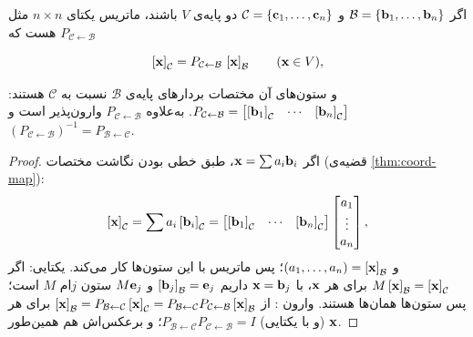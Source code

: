 \begin{theorem}\label{thm:change-basis}
اگر $\mathcal{B}=\{\mathbf{b}_1,\dots,\mathbf{b}_n\}$ و $\mathcal{C}=\{\mathbf{c}_1,\dots,\mathbf{c}_n\}$ دو پایه‌ی $V$ باشند، ماتریس یکتای $n\times n$ مثل $P_{\mathcal{C}\leftarrow\mathcal{B}}$ هست که
\begin{keyformula}
\[
\left[\mathbf{x}\right]_{\mathcal{C}}=P_{\mathcal{C}\leftarrow\mathcal{B}}\,\left[\mathbf{x}\right]_{\mathcal{B}}\qquad(\mathbf{x}\in V),
\]
\end{keyformula}
و ستون‌های آن مختصات بردارهای پایه‌ی $\mathcal{B}$ نسبت به $\mathcal{C}$ هستند:
$P_{\mathcal{C}\leftarrow\mathcal{B}}=\begin{bmatrix}\left[\mathbf{b}_1\right]_{\mathcal{C}}&\cdots&\left[\mathbf{b}_n\right]_{\mathcal{C}}\end{bmatrix}$.
به‌علاوه $P_{\mathcal{C}\leftarrow\mathcal{B}}$ وارون‌پذیر است و $(P_{\mathcal{C}\leftarrow\mathcal{B}})^{-1}=P_{\mathcal{B}\leftarrow\mathcal{C}}$.
\end{theorem}
\begin{proof}
اگر $\mathbf{x}=\sum a_i\mathbf{b}_i$، طبق خطی بودن نگاشت مختصات (قضیه‌ی \ref{thm:coord-map}):
\[
\left[\mathbf{x}\right]_{\mathcal{C}}=\sum a_i\left[\mathbf{b}_i\right]_{\mathcal{C}}=\begin{bmatrix}\left[\mathbf{b}_1\right]_{\mathcal{C}}&\cdots&\left[\mathbf{b}_n\right]_{\mathcal{C}}\end{bmatrix}\begin{bmatrix}a_1\\ \vdots\\ a_n\end{bmatrix},
\]
و $(a_1,\dots,a_n)=\left[\mathbf{x}\right]_{\mathcal{B}}$؛ پس ماتریس با این ستون‌ها کار می‌کند. یکتایی: اگر $M\left[\mathbf{x}\right]_{\mathcal{B}}=\left[\mathbf{x}\right]_{\mathcal{C}}$ برای هر $\mathbf{x}$، با $\mathbf{x}=\mathbf{b}_j$ داریم $\left[\mathbf{b}_j\right]_{\mathcal{B}}=\mathbf{e}_j$ و $M\mathbf{e}_j$ ستون $j$ام $M$ است؛ پس ستون‌ها همان‌ها هستند. وارون : از
$\left[\mathbf{x}\right]_{\mathcal{B}}=P_{\mathcal{B}\leftarrow\mathcal{C}}\left[\mathbf{x}\right]_{\mathcal{C}}=P_{\mathcal{B}\leftarrow\mathcal{C}}P_{\mathcal{C}\leftarrow\mathcal{B}}\left[\mathbf{x}\right]_{\mathcal{B}}$
برای هر $\mathbf{x}$ (و با یکتایی) $P_{\mathcal{B}\leftarrow\mathcal{C}}P_{\mathcal{C}\leftarrow\mathcal{B}}=I$؛ و برعکس‌اش هم همین‌طور.
\end{proof}

\begin{center}
\end{center}

